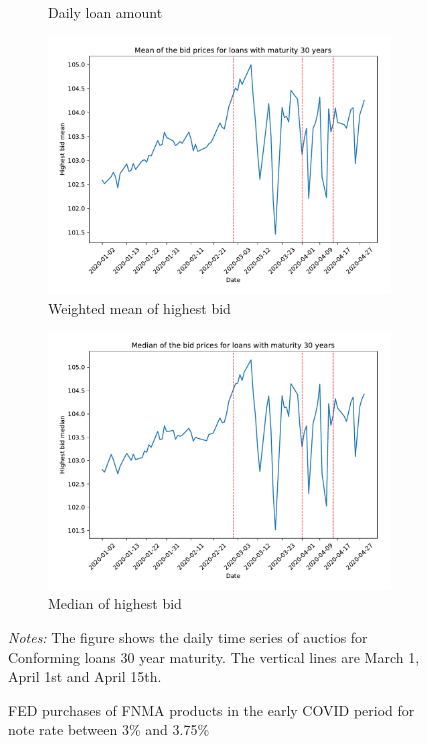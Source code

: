 \documentclass[11pt,a4paper]{article}
\begin{document}
\begin{figure}[h]
\begin{subfigure}[b]{0.49\textwidth}
      \caption{ Daily loan amount}
     \end{subfigure}
     \begin{subfigure}[b]{0.49\textwidth}
      \includegraphics[width=0.998\textwidth]{../results/figures/w_winner_bid_mean_mat30_loan1_timeseries_nr_3_3.75.pdf}
      \caption{ Weighted mean of highest bid}
     \end{subfigure}
     \begin{subfigure}[b]{0.49\textwidth}
      \includegraphics[width=0.998\textwidth]{../results/figures/winner_bid_median_mat30_loan1_timeseries_nr_3_3.75.pdf}
      \caption{ Median of highest bid}
     \end{subfigure}
   \caption{FED purchases of FNMA products in the early COVID period for note rate between 3\% and 3.75\%}
   \begin{minipage}{\textwidth}
      \footnotesize{\textit{Notes:} The figure shows the daily time series of auctios for Conforming loans 30 year maturity. The vertical lines are March 1, April 1st and April 15th. } 
      \end{minipage}
\end{figure}
\end{document}
